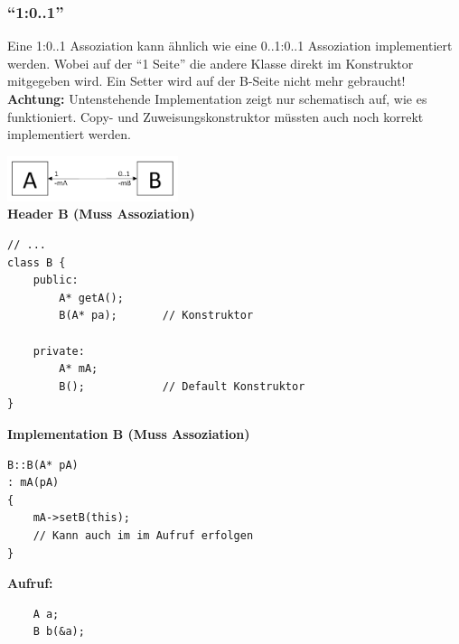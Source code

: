 \subsubsection{"`1:0..1"'}
Eine 1:0..1 Assoziation kann ähnlich wie eine 0..1:0..1 Assoziation
implementiert werden. Wobei auf der "`1 Seite"' die andere Klasse direkt im
Konstruktor mitgegeben wird. Ein Setter wird auf der B-Seite nicht mehr
gebraucht! \textbf{Achtung:} Untenstehende Implementation zeigt nur schematisch auf, wie
es funktioniert. Copy- und Zuweisungskonstruktor müssten auch noch korrekt
implementiert werden.
\begin{multicols}{2}
\includegraphics[width=5cm]{./images/Assozi_1_01.png}\\
\textbf{Header B (Muss Assoziation)}
\begin{lstlisting}
// ...
class B {
	public: 
		A* getA();
		B(A* pa);		// Konstruktor
	
	private:
		A* mA;		
		B();			// Default Konstruktor
}
\end{lstlisting}
\columnbreak
\textbf{Implementation B (Muss Assoziation)}
\begin{lstlisting}
B::B(A* pA)
: mA(pA)
{
	mA->setB(this); 
	// Kann auch im im Aufruf erfolgen
}
\end{lstlisting}

\textbf{Aufruf:}
\begin{lstlisting}
	A a;
	B b(&a);
\end{lstlisting}
\end{multicols}

\newpage

